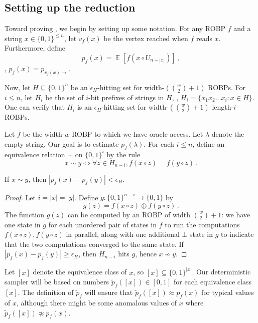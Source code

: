 \documentclass{toc}
\DeclareMathOperator*{\ExpVal}{\mathbb{E}}
\begin{document}
\subsection{Setting up the reduction}
Toward proving , we begin by setting up some notation. For any ROBP $f$ and a string $x \in \{0, 1\}^{\leq n}$, let $v_f(x)$ be the vertex reached when $f$ reads $x$. Furthermore, define
$$
p_f(x) = \ExpVal[f(x \circ U_{n - |x|})]\,,
$$
\ie, $p_f(x) = p_{v_f(x) \to}$.

Now, let $H \subseteq \{0, 1\}^n$ be an $\epsilon_H$-hitting set for width-$(\binom{w}{2} + 1)$ ROBPs. For $i \leq n$, let $H_i$ be the set of $i$-bit prefixes of strings in $H$, \ie, $H_i = \{x_1 x_2 \dots x_i : x \in H\}$. One can verify that $H_i$ is an $\epsilon_H$-hitting set for width-$(\binom{w}{2} + 1)$ length-$i$ ROBPs.

Let $f$ be the width-$w$ ROBP to which we have oracle access. Let $\lambda$ denote the empty string. Our goal is to estimate $p_f(\lambda)$. For each $i \leq n$, define an equivalence relation $\sim$ on $\{0, 1\}^i$ by the rule
$$
x \sim y \iff \forall z \in H_{n - i}, f(x \circ z) = f(y \circ z)\,.
$$
\begin{lemma} \label{lem:equiv}
If $x \sim y$, then $|p_f(x) - p_f(y)| < \epsilon_H$.
\end{lemma}

\begin{proof}
Let $i = |x| = |y|$. Define $g \colon \{0, 1\}^{n - i} \to \{0, 1\}$ by
$$
g(z) = f(x \circ z) \oplus f(y \circ z)\,.
$$
The function $g(z)$ can be computed by an ROBP of width $\binom{w}{2} + 1$: we have one state in $g$ for each unordered pair of states in $f$ to run the computations $f(x \circ z), f(y \circ z)$ in parallel, along with one additional $\bot$ state in $g$ to indicate that the two computations converged to the same state. If $|p_f(x) - p_f(y)| \geq \epsilon_H$, then $H_{n - i}$ hits $g$, hence $x \not \sim y$.
\end{proof}

Let $[x]$ denote the equivalence class of $x$, so $[x] \subseteq \{0, 1\}^{|x|}$. Our deterministic sampler will be based on numbers $\widetilde{p}_f([x]) \in [0, 1]$ for each equivalence class $[x]$. The definition of $\widetilde{p}_f$ will ensure that $\widetilde{p}_f([x]) \approx p_f(x)$ for typical values of $x$, although there might be some anomalous values of $x$ where $\widetilde{p}_f([x]) \not \approx p_f(x)$.
\end{document}
